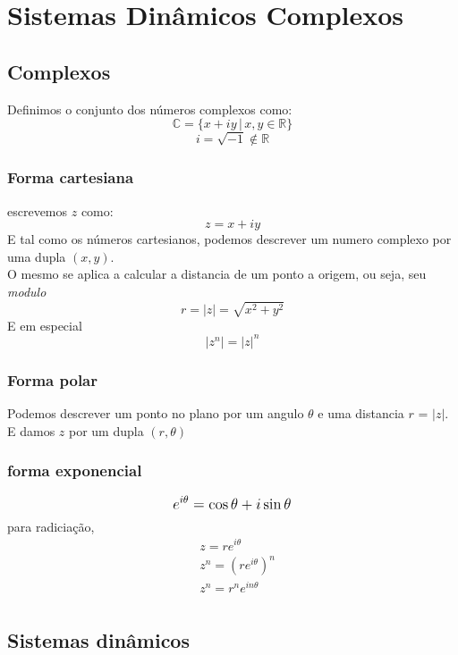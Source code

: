 \documentclass[12pt]{report}
\theoremstyle{definition}
\begin{document}
\chapter{Sistemas Dinâmicos Complexos}

\section{Complexos}

Definimos o conjunto dos números complexos como:
\[
    \mathbb{C} = \{ x + iy\, |\, x,y \in \mathbb{R} \} 
\]
\[
    i = \sqrt{-1} \notin \mathbb{R}
\]

\subsection{Forma cartesiana}

escrevemos \(z\) como:
\[
    z = x + iy
\]
E tal como os números cartesianos, podemos descrever um numero complexo por uma dupla \((x,y)\).\\
O mesmo se aplica a calcular a distancia de um ponto a origem, ou seja, seu \textit{modulo}
\[
    r = |z| = \sqrt{x^2 + y^2}
\]
E em especial
\[
    |z^n| =  |z|^n
\]
\subsection{Forma polar}

Podemos descrever um ponto no plano por um angulo \(\theta\) e uma distancia \(r\) = \(|z|\). E damos \(z\) por um dupla \((r, \theta)\) 

\subsection{forma exponencial}

\begin{equation}
    \mathlarger{e^{i\theta} = \cos{\theta} + i\sin{\theta}}
\end{equation}
para radiciação,
\begin{align*}
    &z = re^{i \theta} \\
    &z^n = (re^{i \theta})^n\\
    &z^n = r^n e^{i n \theta} \\
\end{align*}


\section{Sistemas dinâmicos}
\end{document}
